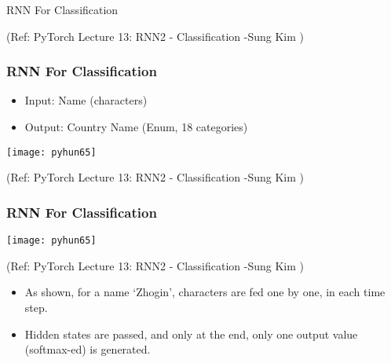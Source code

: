 \begin{frame}
  \begin{center}
    {\Large RNN For Classification}
    
\tiny{(Ref:  PyTorch Lecture 13: RNN2 - Classification -Sung Kim )}
  \end{center}
\end{frame}



\begin{frame}[fragile] \frametitle{RNN For Classification}

\begin{itemize}
\item Input: Name (characters)
\item Output: Country Name (Enum, 18 categories)
\end{itemize}

 
 
\begin{center}
\texttt{[image: pyhun65]}

\tiny{(Ref:  PyTorch Lecture 13: RNN2 - Classification -Sung Kim )}
\end{center}


\end{frame}

\begin{frame}[fragile] \frametitle{RNN For Classification}

 
\begin{center}
\texttt{[image: pyhun65]}

\tiny{(Ref:  PyTorch Lecture 13: RNN2 - Classification -Sung Kim )}
\end{center}
\begin{itemize}
\item As shown, for a name `Zhogin', characters are fed one by one, in each time step.
\item Hidden states are passed, and only at the end, only one output value (softmax-ed) is generated.
\end{itemize}

\end{frame}

